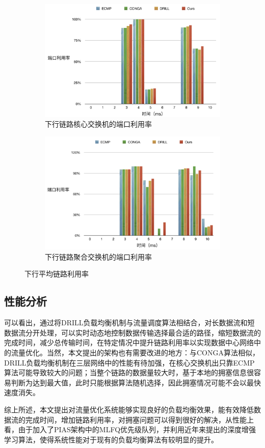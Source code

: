 \begin{figure}[htb!]
\centering
\begin{subfigure}{0.47\textwidth}
     \includegraphics[width=\textwidth]{figure/downcore.png}
     \caption{下行链路核心交换机的端口利用率}
\end{subfigure}\hspace{2em}
\begin{subfigure}{0.47\textwidth}
    \includegraphics[width=\textwidth]{figure/downagg.png}
    \caption{下行链路聚合交换机的端口利用率}

\end{subfigure}%
\caption{下行平均链路利用率}
\label{fig:downcoreagg}
\end{figure}



\subsection{性能分析}
可以看出，通过将DRILL负载均衡机制与流量调度算法相结合，对长数据流和短数据流分开处理，可以实时动态地控制数据传输选择最合适的路径，缩短数据流的完成时间，减少总传输时间，在特定情况中提升链路利用率以实现数据中心网络中的流量优化。当然，本文提出的架构也有需要改进的地方：与CONGA算法相似，DRILL负载均衡机制在三层网络中的性能有待加强，在核心交换机出只靠ECMP算法可能导致较大的问题；当整个链路的数据量较大时，基于本地的拥塞信息很容易判断为达到最大值，此时只能根据算法随机选择，因此拥塞情况可能不会以最快速度消失。

综上所述，本文提出对流量优化系统能够实现良好的负载均衡效果，能有效降低数据流的完成时间，增加链路利用率，对拥塞问题可以得到很好的解决，从性能上看，由于加入了PIAS架构中的MLFQ优先级队列，并利用近年来提出的深度增强学习算法，使得系统性能对于现有的负载均衡算法有较明显的提升。

